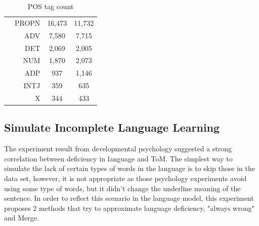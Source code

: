 \documentclass[12pt]{article}
\begin{document}
\begin{table}[!h]
\begin{center}
\begin{tabular}{|c|r|c|c|}
                               & PROPN   & 16,473          & 11,732          \\ \cline{2-4} 
                               & ADV     & 7,580           & 7,715           \\ \cline{2-4} 
                               & DET     & 2,069           & 2,005           \\ \cline{2-4} 
                               & NUM     & 1,870           & 2,073           \\ \cline{2-4} 
                               & ADP     & 937             & 1,146           \\ \cline{2-4} 
                               & INTJ    & 359             & 635             \\ \cline{2-4} 
                               & X       & 344             & 433             \\ \hline
\end{tabular}
     \caption{POS tag count}
    \label{tab:poscount}
\end{center}
\end{table}

\subsection{Simulate Incomplete Language Learning} \label{incomplearning}
The experiment result from developmental psychology suggested a strong correlation between deficiency in language and ToM. The simplest way to simulate the lack of certain types of words in the language is to skip those in the data set, however, it is not appropriate as those psychology experiments avoid using some type of words, but it didn't change the underline meaning of the sentence.    
In order to reflect this scenario in the language model, this experiment proposes 2 methods that try to approximate language deficiency, "always wrong" and Merge. 
\end{document}
